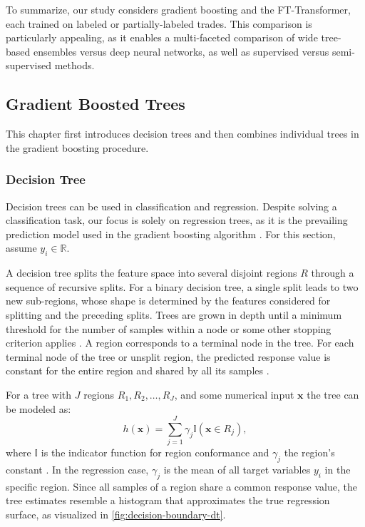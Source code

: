 To summarize, our study considers gradient boosting and the FT-Transformer, each trained on labeled or partially-labeled trades. This comparison is particularly appealing, as it enables a multi-faceted comparison of wide tree-based ensembles versus deep neural networks, as well as supervised versus semi-supervised methods.

\subsection{Gradient Boosted Trees}\label{sec:gradient-boosted-trees}

This chapter first introduces decision trees and then combines individual trees in the gradient boosting procedure.

\subsubsection{Decision Tree}\label{sec:decision-tree}

Decision trees can be used in classification and regression. Despite solving a classification task, our focus is solely on regression trees, as it is the prevailing prediction model used in the gradient boosting algorithm \autocite[][1198--1199]{friedmanGreedyFunctionApproximation2001}. For this section, assume $y_i \in \mathbb{R}$.

A decision tree splits the feature space into several disjoint regions $R$ through a sequence of recursive splits. For a binary decision tree, a single split leads to two new sub-regions, whose shape is determined by the features considered for splitting and the preceding splits. Trees are grown in depth until a minimum threshold for the number of samples within a node or some other stopping criterion applies \autocite[][42]{breimanClassificationRegressionTrees2017}.
A region corresponds to a terminal node in the tree. For each terminal node of the tree or unsplit region, the predicted response value is constant for the entire region and shared by all its samples \autocite[][229]{breimanClassificationRegressionTrees2017}.

For a tree with $J$ regions $R_1, R_2,\ldots, R_J$, and some numerical input $\mathbf{x}$ the tree can be modeled as:
\begin{equation}
    h(\mathbf{x})=\sum_{j=1}^{J} \gamma_{j} \mathbb{I}\left(\mathbf{x} \in R_{j}\right),
    \label{eq:decision-tree}
\end{equation}
where $\mathbb{I}$ is the indicator function for region conformance and $\gamma_j$ the region's constant \autocite[][307]{hastietrevorElementsStatisticalLearning2009}. In the regression case, $\gamma_j$ is the mean of all target variables $y_i$ in the specific region. Since all samples of a region share a common response value, the tree estimates resemble a histogram that approximates the true regression surface, as visualized in \cref{fig:decision-boundary-dt}.


